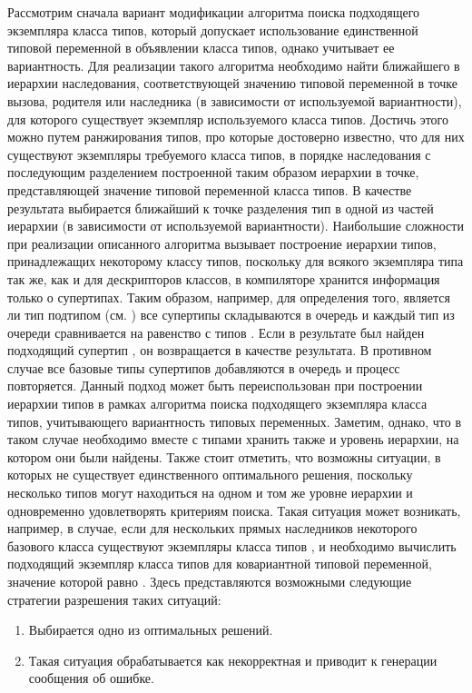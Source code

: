 Рассмотрим сначала вариант модификации алгоритма поиска подходящего экземпляра класса типов, который допускает использование единственной типовой переменной в объявлении класса типов, однако учитывает ее вариантность. Для реализации такого алгоритма необходимо найти ближайшего в иерархии наследования, соответствующей значению типовой переменной в точке вызова, родителя или наследника (в зависимости от используемой вариантности), для которого существует экземпляр используемого класса типов. Достичь этого можно путем ранжирования типов, про которые достоверно известно, что для них существуют экземпляры требуемого класса типов, в порядке наследования с последующим разделением построенной таким образом иерархии в точке, представляющей значение типовой переменной класса типов. В качестве результата выбирается ближайший к точке разделения тип в одной из частей иерархии (в зависимости от используемой вариантности). Наибольшие сложности при реализации описанного алгоритма вызывает построение иерархии типов, принадлежащих некоторому классу типов, поскольку для всякого экземпляра типа так же, как и для дескрипторов классов, в компиляторе хранится информация только о супертипах. Таким образом, например, для определения того, является ли тип  подтипом  (см. ) все супертипы  складываются в очередь и каждый тип из очереди сравнивается на равенство с типов . Если в результате был найден подходящий супертип , он возвращается в качестве результата. В противном случае все базовые типы супертипов  добавляются в очередь и процесс повторяется. Данный подход может быть переиспользован при построении иерархии типов в рамках алгоритма поиска подходящего экземпляра класса типов, учитывающего вариантность типовых переменных. Заметим, однако, что в таком случае необходимо вместе с типами хранить также и уровень иерархии, на котором они были найдены. Также стоит отметить, что возможны ситуации, в которых не существует единственного оптимального решения, поскольку несколько типов могут находиться на одном и том же уровне иерархии и одновременно удовлетворять критериям поиска. Такая ситуация может возникать, например, в случае, если для нескольких прямых наследников некоторого базового класса  существуют экземпляры класса типов , и необходимо вычислить подходящий экземпляр класса типов  для ковариантной типовой переменной, значение которой равно . Здесь представляются возможными следующие стратегии разрешения таких ситуаций:
\begin{enumerate}
    \item Выбирается одно из оптимальных решений. 
    \item Такая ситуация обрабатывается как некорректная и приводит к генерации сообщения об ошибке.
\end{enumerate}
